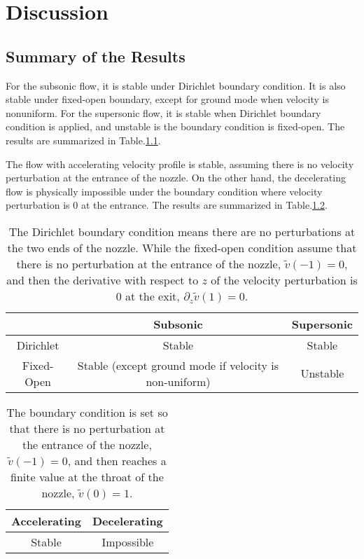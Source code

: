 \chapter{Discussion} \label{chap:discussion}
\section{Summary of the Results}
For the subsonic flow, it is stable under Dirichlet boundary condition. It is also stable under fixed-open boundary, except for ground mode when velocity is nonuniform. For the supersonic flow, it is stable when Dirichlet boundary condition is applied, and unstable is the boundary condition is fixed-open. The results are summarized in Table.\ref{table:results-subsonic-supersonic}.

The flow with accelerating velocity profile is stable, assuming there is no velocity perturbation at the entrance of the nozzle. On the other hand, the decelerating flow is physically impossible under the boundary condition where velocity perturbation is 0 at the entrance. The results are summarized in Table.\ref{table:results-accelerating-decelerating}.

\begin{table} [htbp]
    \centering
    \begin{tabular}{| c | c | c |}
        \hline
                   & Subsonic                                               & Supersonic \\
        \hline
        Dirichlet  & Stable                                                 & Stable     \\
        \hline
        Fixed-Open & Stable (except ground mode if velocity is non-uniform) & Unstable   \\
        \hline
    \end{tabular}
    \caption{The Dirichlet boundary condition means there are no perturbations at the two ends of the nozzle. While the fixed-open condition assume that there is no perturbation at the entrance of the nozzle, $\tilde{v}(-1)=0$, and then the derivative with respect to $z$ of the velocity perturbation is 0 at the exit, $\partial_z\tilde{v}(1)=0$.}
    \label{table:results-subsonic-supersonic}
\end{table}

\begin{table} [htbp]
    \centering
    \begin{tabular}{|c | c|}
        \hline
        Accelerating & Decelerating \\
        \hline
        Stable       & Impossible   \\
        \hline
    \end{tabular}
    \caption{The boundary condition is set so that there is no perturbation at the entrance of the nozzle, $\tilde{v}(-1)=0$, and then reaches a finite value at the throat of the nozzle, $\tilde{v}(0)=1$.}
    \label{table:results-accelerating-decelerating}
\end{table}

